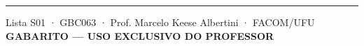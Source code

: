 \documentclass[12pt,a4paper]{article}
\begin{document}
\vspace{1cm}
\hrule
\vspace{0.3cm}
\begin{center}
  {\footnotesize Lista S01 · GBC063 · Prof. Marcelo Keese Albertini · FACOM/UFU}
  \ifdefined\GABARITO
    \ifnum{}
      \\[0.2cm] {\footnotesize\color{red}\textbf{GABARITO — USO EXCLUSIVO DO PROFESSOR}}
    \fi
  \fi
\end{center}
\end{document}
